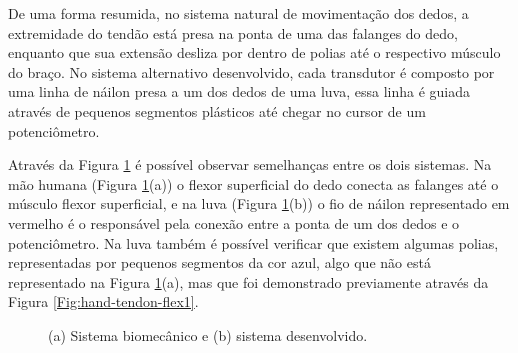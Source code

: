 \documentclass[
	12pt,				%
	openright,			%
	oneside,			%
	a4paper,			%
	english,			%
	brazil				%
	]{abntex2}
\begin{document}
		De uma forma resumida, no sistema natural de movimentação dos dedos, a extremidade do tendão está presa na ponta de uma das falanges do dedo, enquanto que sua extensão desliza por dentro de polias até o respectivo músculo do braço. No sistema alternativo desenvolvido, cada transdutor é composto por uma linha de náilon presa a um dos dedos de uma luva, essa linha é guiada através de pequenos segmentos plásticos até chegar no cursor de um potenciômetro. 
		
		Através da Figura \ref{Fig:bio-and-system} é possível observar semelhanças entre os dois sistemas. Na mão humana (Figura \ref{Fig:bio-and-system}(a)) o flexor superficial do dedo conecta as falanges até o músculo flexor superficial, e na luva (Figura \ref{Fig:bio-and-system}(b)) o fio de náilon representado em vermelho é o responsável pela conexão entre a ponta de um dos dedos e o potenciômetro. Na luva também é possível verificar que existem algumas polias, representadas por pequenos segmentos da cor azul, algo que não está representado na Figura \ref{Fig:bio-and-system}(a), mas que foi demonstrado previamente através da Figura \ref{Fig:hand-tendon-flex1}.

	\begin{figure}[!htb]
		 \centering
		 \caption{(a) Sistema biomecânico e (b) sistema desenvolvido.} 
		 \centering
		 \label{Fig:bio-and-system}
	\end{figure}
\end{document}
